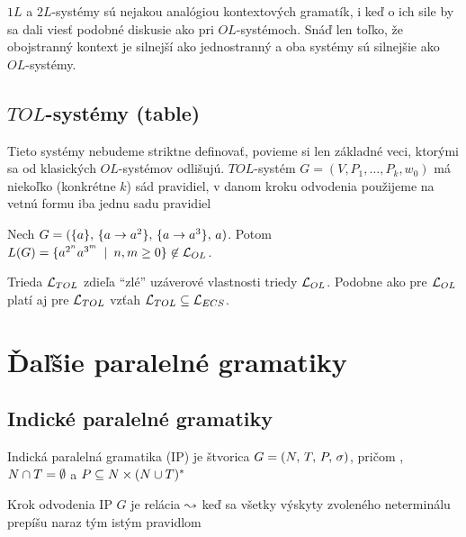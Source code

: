 \begin{poznamka}
  $1L$ a $2L$-systémy sú nejakou analógiou kontextových gramatík, i
  keď o ich sile by sa dali viesť podobné diskusie ako pri
  $OL$-systémoch. Snáď len toľko, že obojstranný kontext je silnejší
  ako jednostranný a oba systémy sú silnejšie ako $OL$-systémy.
\end{poznamka}

\subsection{$TOL$-systémy (table)}

Tieto systémy nebudeme striktne definovať, povieme si len základné
veci, ktorými sa od kla\-sic\-kých $OL$-systémov odlišujú.
$TOL$-systém $G = (V, P_1, \dots, P_k, w_0)$ má niekoľko
(konkrétne $k$) sád pravidiel, v danom kroku odvodenia použijeme
na vetnú formu iba jednu sadu pravidiel

\begin{priklad}
  Nech
  $G = (\{a\},\,\{a\rightarrow a^2\},\,\{a\rightarrow a^3\},\,a)$.
  Potom
  $L(G) = \{a^{2^n} a^{3^m} \enspace |\enspace n,m \ge 0\}
    \not \in \mathcal{L}_{OL}$.
\end{priklad}

\begin{poznamka}
  Trieda $\mathcal{L}_{TOL}$ zdieľa ``zlé'' uzáverové vlastnosti
  triedy $\mathcal{L}_{OL}$. Podobne ako pre $\mathcal{L}_{OL}$
  platí aj pre $\mathcal{L}_{TOL}$ vzťah
  $\mathcal{L}_{TOL} \subseteq \mathcal{L}_{ECS}$.
\end{poznamka}

\section{Ďaľšie paralelné gramatiky}

\subsection{Indické paralelné gramatiky}

\begin{definicia}
  Indická paralelná gramatika (IP) je štvorica
  $G = (N,\,T,\,P,\,\sigma)$,
  pričom , $N \cap T = \emptyset$
  a $P \subseteq N \times(N \cup T)^{*}$
\end{definicia}

\begin{definicia}
  Krok odvodenia IP $G$ je relácia $\leadsto$ keď sa všetky výskyty
  zvoleného neterminálu prepíšu naraz tým istým pravidlom
\end{definicia}

